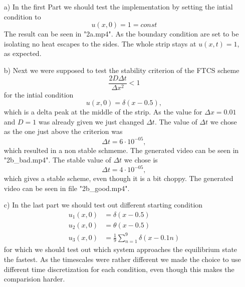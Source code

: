 \begin{itemize}
    \item[a)]
        In the first Part we should test the implementation by setting the intial condition to 
        \begin{equation}
            u(x,0) = 1 = const
        \end{equation}
        The result can be seen in "2a.mp4".
        As the boundary condition are set to be isolating no heat escapes to the sides.
        The whole strip stays at $u(x,t) = 1$, as expected.
    \item[b)]
        Next we were supposed to test the stability criterion of the FTCS scheme
        \begin{equation}
            \frac{2D \Delta t}{\Delta x^2} < 1
        \end{equation}
        for the intial condition
        \begin{equation}
            u(x,0) = \delta(x-0.5),
        \end{equation}
        which is a delta peak at the middle of the strip.
        As the value for $\Delta x = 0.01$ and $D = 1$ was already given we just changed $\Delta t$.
        The value of $\Delta t$ we chose as the one just above the criterion was
        \begin{equation*}
            \Delta t = 6\cdot10^{-05},
        \end{equation*}
        which resulted in a non stable schmeme.
        The generated video can be seen in "2b\_bad.mp4".
        The stable value of $\Delta t$ we chose is 
        \begin{equation*}
            \Delta t = 4\cdot10^{-05},
        \end{equation*}
        which gives a stable scheme, even though it is a bit choppy.
        The generated video can be seen in file "2b\_good.mp4".
    \item[c)]
        In the last part we should test out different starting condition
        \begin{align}
            u_1(x,0) &= \delta(x - 0.5)\\
            u_2(x,0) &= \theta(x - 0.5)\\
            u_3(x,0) &= \frac{1}{9} \sum_{n=1} ^9 \delta(x-0.1n)
        \end{align}
        for which we should test out which system approaches the equilibrium state the fastest.
        As the timescales were rather different we made the choice to use different time discretization for each condition, even though this makes the comparision harder.

\end{itemize}
